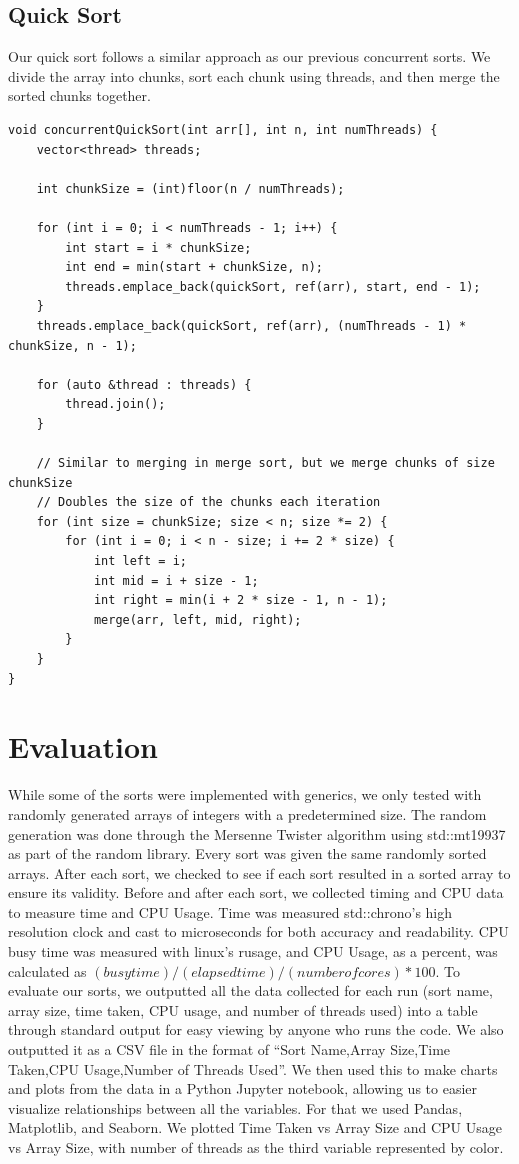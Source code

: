 \documentclass[conference]{IEEEtran}
\begin{document}
\subsection{Quick Sort}
Our quick sort follows a similar approach as our previous concurrent sorts. We divide the array into chunks, sort each chunk using threads, and then merge the sorted chunks together.
\\
\begin{lstlisting}
void concurrentQuickSort(int arr[], int n, int numThreads) {
    vector<thread> threads;

    int chunkSize = (int)floor(n / numThreads);

    for (int i = 0; i < numThreads - 1; i++) {
        int start = i * chunkSize;
        int end = min(start + chunkSize, n);
        threads.emplace_back(quickSort, ref(arr), start, end - 1);
    }
    threads.emplace_back(quickSort, ref(arr), (numThreads - 1) * chunkSize, n - 1);
    
    for (auto &thread : threads) {
        thread.join();
    }

    // Similar to merging in merge sort, but we merge chunks of size chunkSize
    // Doubles the size of the chunks each iteration
    for (int size = chunkSize; size < n; size *= 2) {
        for (int i = 0; i < n - size; i += 2 * size) {
            int left = i;
            int mid = i + size - 1;
            int right = min(i + 2 * size - 1, n - 1);
            merge(arr, left, mid, right);
        }
    }
}
\end{lstlisting}

\section{Evaluation}
While some of the sorts were implemented with generics, we only tested with randomly generated arrays of integers with a predetermined size. The random generation was done through the Mersenne Twister algorithm using std::mt19937 as part of the random library. Every sort was given the same randomly sorted arrays. After each sort, we checked to see if each sort resulted in a sorted array to ensure its validity. Before and after each sort, we collected timing and CPU data to measure time and CPU Usage. Time was measured std::chrono's high resolution clock and cast to microseconds for both accuracy and readability. CPU busy time was measured with linux's rusage, and CPU Usage, as a percent, was calculated as $(busy time) / (elapsed time) / (number of cores) * 100$. To evaluate our sorts, we outputted all the data collected for each run (sort name, array size, time taken, CPU usage, and number of threads used) into a table through standard output for easy viewing by anyone who runs the code. We also outputted it as a CSV file in the format of “Sort Name,Array Size,Time Taken,CPU Usage,Number of Threads Used”. We then used this to make charts and plots from the data in a Python Jupyter notebook, allowing us to easier visualize relationships between all the variables. For that we used Pandas, Matplotlib, and Seaborn. We plotted Time Taken vs Array Size and CPU Usage vs Array Size, with number of threads as the third variable represented by color.
\end{document}
